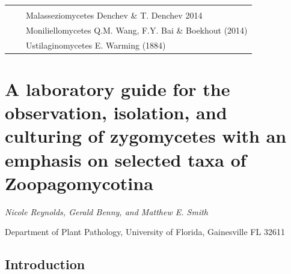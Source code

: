 \documentclass[]{book}
\begin{document}
\begin{longtable}[]{@{}lll@{}}
\begin{minipage}[t]{0.31\columnwidth}
\end{minipage}\tabularnewline
\begin{minipage}[t]{0.32\columnwidth}\raggedright\strut
\strut
\end{minipage} & \begin{minipage}[t]{0.28\columnwidth}\raggedright\strut
\strut
\end{minipage} & \begin{minipage}[t]{0.31\columnwidth}\raggedright\strut
Malasseziomycetes Denchev \& T. Denchev 2014\strut
\end{minipage}\tabularnewline
\begin{minipage}[t]{0.32\columnwidth}\raggedright\strut
\strut
\end{minipage} & \begin{minipage}[t]{0.28\columnwidth}\raggedright\strut
\strut
\end{minipage} & \begin{minipage}[t]{0.31\columnwidth}\raggedright\strut
Moniliellomycetes Q.M. Wang, F.Y. Bai \& Boekhout (2014)\strut
\end{minipage}\tabularnewline
\begin{minipage}[t]{0.32\columnwidth}\raggedright\strut
\strut
\end{minipage} & \begin{minipage}[t]{0.28\columnwidth}\raggedright\strut
\strut
\end{minipage} & \begin{minipage}[t]{0.31\columnwidth}\raggedright\strut
Ustilaginomycetes E. Warming (1884)\strut
\end{minipage}\tabularnewline
\bottomrule
\end{longtable}

\chapter{A laboratory guide for the observation, isolation, and
culturing of zygomycetes with an emphasis on selected taxa of
Zoopagomycotina}\label{lab_zoopago}

\emph{Nicole Reynolds, Gerald Benny, and Matthew E. Smith}

Department of Plant Pathology, University of Florida, Gainesville FL
32611

\section{Introduction}\label{introduction}
\end{document}
